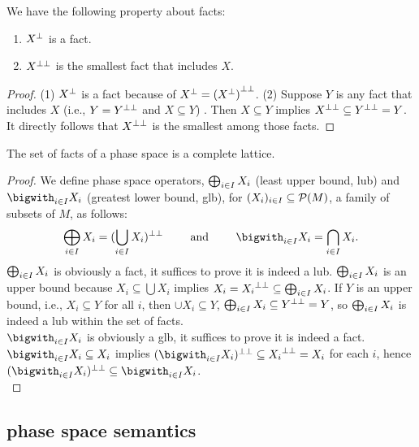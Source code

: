 \begin{proposition}  \label{propOfFact}
We have the following property about facts:
\begin{enumerate}
\item ${{X}^{\bot}}$ is a fact. 
\item ${{X}^{\bot\bot}}$ is the smallest fact that includes $X$. 
\end{enumerate}
\end{proposition}
%
\begin{proof}
(1) ${{X}^{\bot}}$ is a fact because of ${{X}^{\bot}} = {{({{X}^{\bot}})}^{\bot\bot}}$. 
(2) Suppose $Y$ is any fact that includes $X$  (i.e., $Y = {{Y}^{\bot\bot}}$ and $X \subseteq Y$) .
Then $X \subseteq Y$ implies ${{X}^{\bot\bot}} \subseteq {{Y}^{\bot\bot}} = Y$.
It directly follows that ${{X}^{\bot\bot}}$ is the smallest among those facts. 

\end{proof}
%
\begin{proposition}
The set of facts of a phase space is a complete lattice. 
\end{proposition}
\begin{proof}
We define phase space operators, 
$\bigoplus_ {i \in I} X_i$ (least upper bound, lub) and $\PSglb$ (greatest lower bound, glb),  
for $(X_i)_{i \in I} \subseteq \mathcal{P}(M)$, a family of subsets of $M$,  as follows:
%
\[
\PSlub = \dlnegP{\bigcup_{ i \in I}  X_i} 
\hskip 24pt \mbox{and} \hskip 24pt
\PSglb = \bigcap_{ i \in I}  X_i \mbox{.}
\]
%
$\bigoplus_ {i \in I} X_i$ is obviously a fact, it suffices to prove it is indeed a lub.
$\bigoplus_ {i \in I} X_i$ is an upper bound 
because $X_i \subseteq \bigcup X_i$ implies $X_i = {{X_i}^{\bot\bot}} \subseteq \bigoplus_ {i \in I} X_i$.
If $Y$ is an upper bound, i.e., $X_i \subseteq Y$ for all $i$, 
then $\cup X_i \subseteq Y$,  $\bigoplus_ {i \in I} X_i \subseteq {{Y}^{\bot\bot}} = Y $, 
so $\bigoplus_ {i \in I} X_i$ is indeed a lub within the set of facts. \\
$\PSglb$ is obviously a glb, it suffices to prove it is indeed a fact. 
$\PSglb \subseteq X_i$ implies $\dlnegP{\PSglb} \subseteq \dlneg{X_i} = X_i$ for each $i$, 
hence $\dlnegP{\PSglb} \subseteq \PSglb$. \\
\end{proof}

\subsection{phase space semantics}

